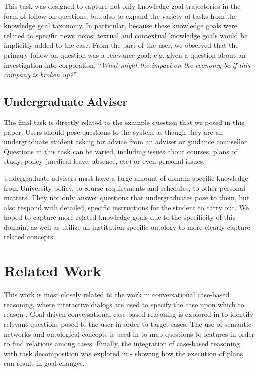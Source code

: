\documentclass{llncs}
\begin{document}
This task was designed to capture not only knowledge goal trajectories in the form of follow-on questions, but also to expand the variety of tasks from the knowledge goal taxonomy. In particular, because these knowledge goals were related to specific news items; textual and contextual knowledge goals would be implicitly added to the case. From the part of the user, we observed that the primary follow-on question was a relevance goal; e.g. given a question about an investigation into corporation, ``\textit{What might the impact on the economy be if this company is broken up?}''

\subsection{Undergraduate Adviser}

The final task is directly related to the example question that we posed in this paper. Users should pose questions to the system as though they are an undergraduate student asking for advice from an adviser or guidance counsellor. Questions in this task can be varied, including issues about courses, plans of study, policy (medical leave, absence, etc) or even personal issues.

Undergraduate advisers must have a large amount of domain specific knowledge from University policy, to course requirements and schedules, to other personal matters. They not only answer questions that undergraduates pose to them, but also respond with detailed, specific instructions for the student to carry out. We hoped to capture more related knowledge goals due to the specificity of this domain, as well as utilize an institution-specific ontology to more clearly capture related concepts.

\section{Related Work}

This work is most closely related to the work in conversational case-based reasoning, where interactive dialogs are used to specify the case upon which to reason \cite{aha_advances_2005}. Goal-driven conversational case-based reasoning is explored in \cite{mcsherry_conversational_2005} to identify relevant questions posed to the user in order to target cases. The use of semantic networks and ontological concepts is used in \cite{gu_knowledge-intensive_2005} to map questions to features in order to find relations among cases. Finally, the integration of case-based reasoning with task decomposition was explored in \cite{munoz-avila_sin:_2001} - showing how the execution of plans can result in goal changes.
\end{document}
